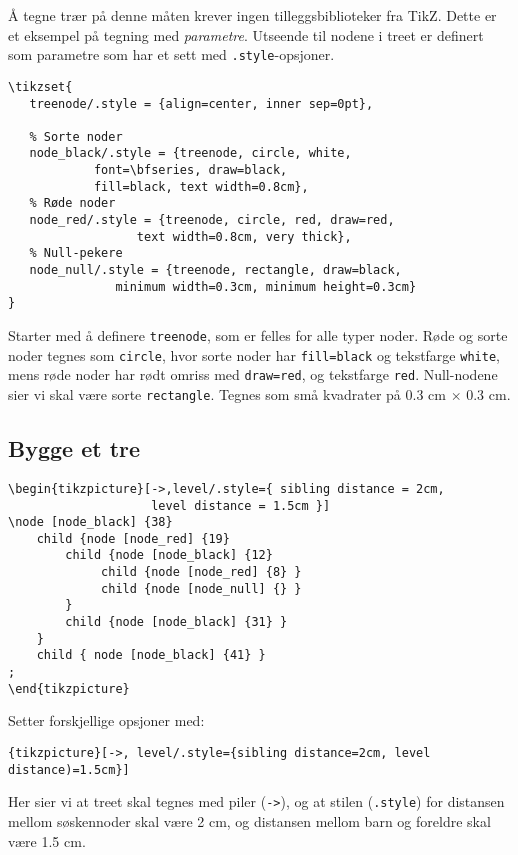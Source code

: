 \documentclass[12pt, a4paper]{article}
\begin{document}
Å tegne trær på denne måten krever ingen tilleggsbiblioteker fra TikZ. Dette er et eksempel på tegning med \textit{parametre}. Utseende til nodene i treet er definert som parametre som har et sett med \texttt{.style}-opsjoner.
\begin{Verbatim}[fontsize=\small, frame=single]
\tikzset{
   treenode/.style = {align=center, inner sep=0pt},
	
   % Sorte noder
   node_black/.style = {treenode, circle, white, 
			font=\bfseries, draw=black,
			fill=black, text width=0.8cm},
   % Røde noder
   node_red/.style = {treenode, circle, red, draw=red, 
	              text width=0.8cm, very thick},
   % Null-pekere
   node_null/.style = {treenode, rectangle, draw=black, 
		       minimum width=0.3cm, minimum height=0.3cm}
}
\end{Verbatim}
Starter med å definere \texttt{treenode}, som er felles for alle typer noder. Røde og sorte noder tegnes som \texttt{circle}, hvor sorte noder har \texttt{fill=black} og tekstfarge \texttt{white}, mens røde noder har rødt omriss med \texttt{draw=red}, og tekstfarge \texttt{red}. Null-nodene sier vi skal være sorte \texttt{rectangle}. Tegnes som små kvadrater på 0.3 cm $\times$ 0.3 cm.

\newpage
\subsection{Bygge et tre}
\begin{Verbatim}[fontsize=\small, frame=single]
\begin{tikzpicture}[->,level/.style={ sibling distance = 2cm, 
                    level distance = 1.5cm }] 
\node [node_black] {38}
    child {node [node_red] {19} 
        child {node [node_black] {12}
             child {node [node_red] {8} }
             child {node [node_null] {} }
        }
        child {node [node_black] {31} }
    }
    child { node [node_black] {41} }
; 
\end{tikzpicture}
\end{Verbatim}

Setter forskjellige opsjoner med:
\begin{center}
\texttt{\{tikzpicture\}[->, level/.style=\{sibling distance=2cm, level distance)=1.5cm\}]}
\end{center}
Her sier vi at treet skal tegnes med piler (\texttt{->}), og at stilen (\texttt{.style}) for distansen mellom søskennoder skal være 2 cm, og distansen mellom barn og foreldre skal være 1.5 cm.
\end{document}
